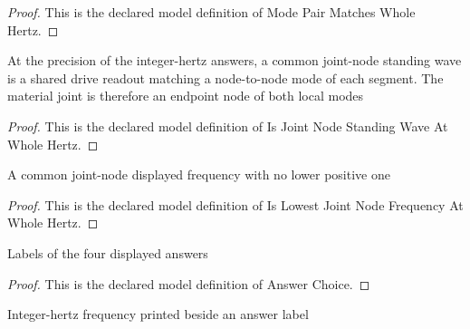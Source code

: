 \begin{proof}
  This is the declared model definition of Mode Pair Matches Whole Hertz.
\end{proof}
\begin{definition}
  \label{def:physics:phyx-mini-0299:phyxminiproblems-problemphyxmini0299-isjointnodestandingwaveatwholehertz}
  At the precision of the integer-hertz answers, a common joint-node standing wave is a shared drive readout matching a node-to-node mode of each segment. The material joint is therefore an endpoint node of both local modes
\end{definition}
\begin{proof}
  This is the declared model definition of Is Joint Node Standing Wave At Whole Hertz.
\end{proof}
\begin{definition}
  \label{def:physics:phyx-mini-0299:phyxminiproblems-problemphyxmini0299-islowestjointnodefrequencyatwholehertz}
  A common joint-node displayed frequency with no lower positive one
\end{definition}
\begin{proof}
  This is the declared model definition of Is Lowest Joint Node Frequency At Whole Hertz.
\end{proof}
\begin{definition}
  \label{def:physics:phyx-mini-0299:phyxminiproblems-problemphyxmini0299-answerchoice}
  Labels of the four displayed answers
\end{definition}
\begin{proof}
  This is the declared model definition of Answer Choice.
\end{proof}
\begin{definition}
  \label{def:physics:phyx-mini-0299:phyxminiproblems-problemphyxmini0299-answerchoice-frequencyinhertz}
  Integer-hertz frequency printed beside an answer label
\end{definition}
